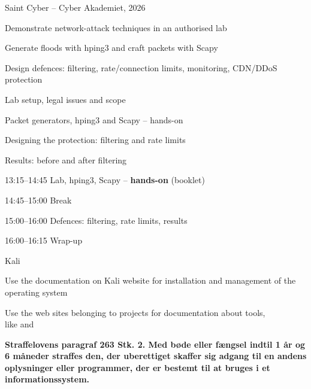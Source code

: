 \documentclass[Screen16to9,17pt]{foils}
\begin{document}
{Saint Cyber -- Cyber Akademiet, 2026}

\begin{list2}
\item Demonstrate network-attack techniques in an authorised lab
\item Generate floods with hping3 and craft packets with Scapy
\item Design defences: filtering, rate/connection limits, monitoring, CDN/DDoS protection
\end{list2}

\begin{list2}
\item Lab setup, legal issues and scope
\item Packet generators, hping3 and Scapy -- hands-on
\item Designing the protection: filtering and rate limits
\item Results: before and after filtering
\end{list2}

\begin{list2}
\item 13:15--14:45 Lab, hping3, Scapy -- \textbf{hands-on} (booklet)
\item 14:45--15:00 Break
\item 15:00--16:00 Defences: filtering, rate limits, results
\item 16:00--16:15 Wrap-up
\end{list2}



\begin{list1}
\item Kali 
\item Use the documentation on Kali website for installation and management of the operating system
\item Use the web sites belonging to projects for documentation about tools, \\
like  and 
\end{list1}


{\bfseries Straffelovens paragraf 263 Stk. 2. Med bøde eller fængsel indtil 1 år og 6 måneder straffes den, der uberettiget skaffer sig adgang til en andens oplysninger eller programmer, der er bestemt til at bruges i et informationssystem. }
\end{document}
